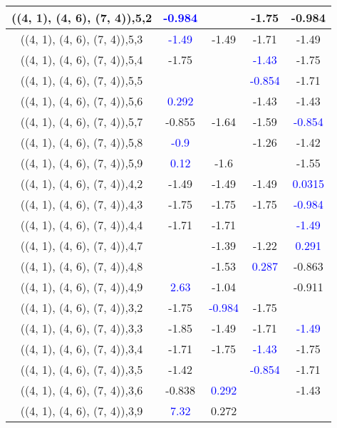 \documentclass{article}
\begin{document}
\begin{center}
\begin{longtable}{|c|c|c|c|c|}
        	((4, 1), (4, 6), (7, 4)),5,2& \textcolor{blue}{-0.984}&&-1.75&-0.984\\
        	\hline
        	((4, 1), (4, 6), (7, 4)),5,3& \textcolor{blue}{-1.49}&-1.49&-1.71&-1.49\\
        	\hline
        	((4, 1), (4, 6), (7, 4)),5,4&-1.75&& \textcolor{blue}{-1.43}&-1.75\\
        	\hline
        	((4, 1), (4, 6), (7, 4)),5,5&&& \textcolor{blue}{-0.854}&-1.71\\
        	\hline
        	((4, 1), (4, 6), (7, 4)),5,6& \textcolor{blue}{0.292}&&-1.43&-1.43\\
        	\hline
        	((4, 1), (4, 6), (7, 4)),5,7&-0.855&-1.64&-1.59& \textcolor{blue}{-0.854}\\
        	\hline
        	((4, 1), (4, 6), (7, 4)),5,8& \textcolor{blue}{-0.9}&&-1.26&-1.42\\
        	\hline
        	((4, 1), (4, 6), (7, 4)),5,9& \textcolor{blue}{0.12}&-1.6&&-1.55\\
        	\hline
        	((4, 1), (4, 6), (7, 4)),4,2&-1.49&-1.49&-1.49& \textcolor{blue}{0.0315}\\
        	\hline
        	((4, 1), (4, 6), (7, 4)),4,3&-1.75&-1.75&-1.75& \textcolor{blue}{-0.984}\\
        	\hline
        	((4, 1), (4, 6), (7, 4)),4,4&-1.71&-1.71&& \textcolor{blue}{-1.49}\\
        	\hline
        	((4, 1), (4, 6), (7, 4)),4,7&&-1.39&-1.22& \textcolor{blue}{0.291}\\
        	\hline
        	((4, 1), (4, 6), (7, 4)),4,8&&-1.53& \textcolor{blue}{0.287}&-0.863\\
        	\hline
        	((4, 1), (4, 6), (7, 4)),4,9& \textcolor{blue}{2.63}&-1.04&&-0.911\\
        	\hline
        	((4, 1), (4, 6), (7, 4)),3,2&-1.75& \textcolor{blue}{-0.984}&-1.75&\\
        	\hline
        	((4, 1), (4, 6), (7, 4)),3,3&-1.85&-1.49&-1.71& \textcolor{blue}{-1.49}\\
        	\hline
        	((4, 1), (4, 6), (7, 4)),3,4&-1.71&-1.75& \textcolor{blue}{-1.43}&-1.75\\
        	\hline
        	((4, 1), (4, 6), (7, 4)),3,5&-1.42&& \textcolor{blue}{-0.854}&-1.71\\
        	\hline
        	((4, 1), (4, 6), (7, 4)),3,6&-0.838& \textcolor{blue}{0.292}&&-1.43\\
        	\hline
        	((4, 1), (4, 6), (7, 4)),3,9& \textcolor{blue}{7.32}&0.272&&\\

\end{longtable}
\end{center}
\end{document}

